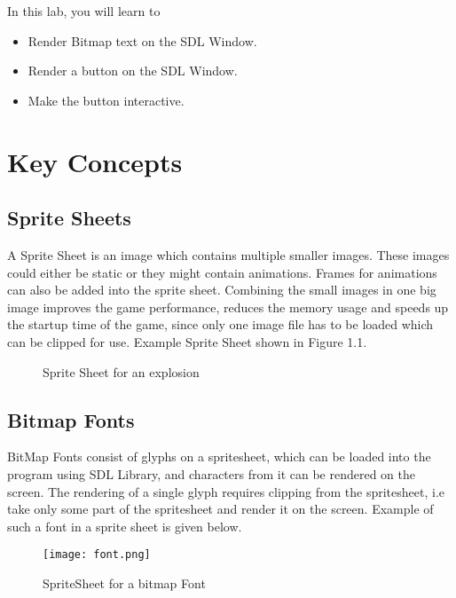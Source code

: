 \documentclass[11pt,fleqn]{book} %
\begin{document}
In this lab, you will learn to

\begin{itemize}
    \item Render Bitmap text on the SDL Window.
    \item Render a button on the SDL Window.
    \item Make the button interactive.
\end{itemize}

\section{Key Concepts}

\subsection{Sprite Sheets}
A Sprite Sheet is an image which contains multiple smaller images. These images could either be static or they might contain animations. Frames for animations can also be added into the sprite sheet. Combining the small images in one big image improves the game performance, reduces the memory usage and speeds up the startup time of the game, since only one image file has to be loaded which can be clipped for use. Example Sprite Sheet shown in Figure 1.1.

\begin{figure}[h]
    \centering
    \caption{Sprite Sheet for an explosion}
\end{figure}


\subsection{Bitmap Fonts}

BitMap Fonts consist of glyphs on a spritesheet, which can be loaded into the program using SDL Library, and characters from it can be rendered on the screen. The rendering of a single glyph requires clipping from the spritesheet, i.e take only some part of the spritesheet and render it on the screen. Example of such a font in a sprite sheet is given below.

\begin{figure}[h]
    \centering
    \texttt{[image: font.png]}
    \caption{SpriteSheet for a bitmap Font}
\end{figure}
\end{document}
